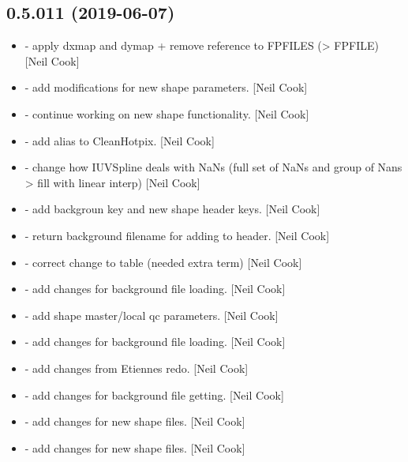 \documentclass[a4paper,10pt,english]{report}
\begin{document}
\subsection{0.5.011 (2019-06-07)}
\label{\detokenize{misc/changelog:id126}}\begin{itemize}
\item {} 
 - apply dxmap and dymap + remove reference to
FPFILES (\textendash{}\textgreater{} FPFILE) {[}Neil Cook{]}

\item {} 
 - add modifications for new shape parameters. {[}Neil
Cook{]}

\item {} 
 - continue working on new shape functionality. {[}Neil
Cook{]}

\item {} 
 - add alias to CleanHotpix. {[}Neil Cook{]}

\item {} 
 - change how IUVSpline deals with NaNs (full set of NaNs
and group of Nans \textendash{}\textgreater{} fill with linear interp) {[}Neil Cook{]}

\item {} 
 - add backgroun key and new shape header keys. {[}Neil
Cook{]}

\item {} 
 - return background filename for adding to header. {[}Neil
Cook{]}

\item {} 
 - correct change to table (needed extra term)
{[}Neil Cook{]}

\item {} 
 - add changes for background file loading.
{[}Neil Cook{]}

\item {} 
 - add shape master/local qc parameters. {[}Neil
Cook{]}

\item {} 
 - add changes for background file loading. {[}Neil
Cook{]}

\item {} 
 - add changes from Etiennes redo. {[}Neil Cook{]}

\item {} 
 - add changes for background file getting. {[}Neil
Cook{]}

\item {} 
 - add changes for new shape files. {[}Neil Cook{]}

\item {} 
 - add changes for new shape files. {[}Neil
Cook{]}

\end{itemize}
\end{document}
